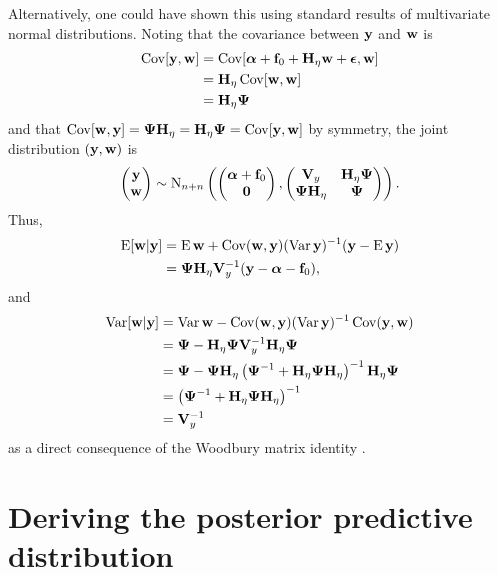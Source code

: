Alternatively, one could have shown this using standard results of multivariate normal distributions.
Noting that the covariance between $\by$ and $\bw$ is  %
\begin{align*}
  \Cov[\by,\bw] 
  &= \Cov[\balpha + \bff_0 + \bH_\eta\bw + \bepsilon, \bw] \\
  &= \bH_\eta\Cov[\bw,\bw] \\
  &= \bH_\eta\bPsi 
\end{align*}
and that $\Cov[\bw,\by] = \bPsi\bH_\eta = \bH_\eta\bPsi = \Cov[\by,\bw]$ by symmetry, the joint distribution $(\by,\bw)$ is
\[
  \begin{pmatrix}
    \by \\
    \bw
  \end{pmatrix}
  \sim \N_{n+n}
  \left(
    \begin{pmatrix}
      \balpha + \bff_0 \\
      \bzero
    \end{pmatrix},
    \begin{pmatrix}
      \bV_y         & \bH_\eta\bPsi \\
      \bPsi\bH_\eta & \bPsi \\
    \end{pmatrix}
  \right).
\] 
Thus,
\begin{align*}
  \E [\bw|\by] 
  &= \E \bw + \Cov(\bw,\by) (\Var \by)^{-1} (\by - \E \by) \\
  &= \bPsi\bH_\eta\bV_y^{-1}(\by - \balpha - \bff_0),
\end{align*}
and
\begin{align*}
  \Var [\bw|\by] 
  &= \Var \bw - \Cov(\bw,\by) (\Var \by)^{-1} \Cov(\by,\bw) \\
  &= \bPsi - \bH_\eta\bPsi\bV_y^{-1}\bH_\eta\bPsi \\
  &= \bPsi - \bPsi\bH_\eta \left(\bPsi^{-1} + \bH_\eta\bPsi\bH_\eta \right)^{-1}\bH_\eta\bPsi  \\
  &= \left(\bPsi^{-1} + \bH_\eta\bPsi\bH_\eta \right)^{-1} \\
  &= \bV_y^{-1}
\end{align*}
as a direct consequence of the Woodbury matrix identity \citep[eq. 156, §3.2.2]{petersen2008matrix}.

\section{Deriving the posterior predictive distribution}
\label{apx:postpred}

